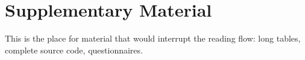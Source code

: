 
\appendix

\chapter{Supplementary Material}\label{app:supplementary}

This is the place for material that would interrupt the reading flow: long tables, complete source code, questionnaires.
